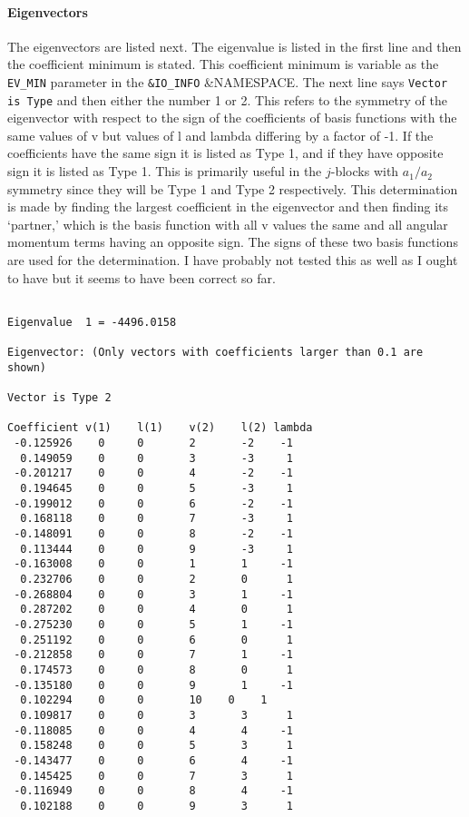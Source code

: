 \documentclass{article}
\begin{document}
\paragraph{Eigenvectors}
The eigenvectors are listed next. The eigenvalue is listed in the first line and then the coefficient minimum is stated. This coefficient minimum is variable as the {\tt EV\_MIN} parameter in the {\tt \&IO\_INFO} \&NAMESPACE. The next line says {\tt Vector is Type} and then either the number 1 or 2. This refers to the symmetry of the eigenvector with respect to the sign of the coefficients of basis functions with the same values of v but values of l and lambda differing by a factor of -1. If the coefficients have the same sign it is listed as Type 1, and if they have opposite sign it is listed as Type 1. This is primarily useful in the $j$-blocks with $a_1/a_2$ symmetry since they will be Type 1 and Type 2 respectively. This determination is made by finding the largest coefficient in the eigenvector and then finding its `partner,' which is the basis function with all v values the same and all angular momentum terms having an opposite sign. The signs of these two basis functions are used for the determination. I have probably not tested this as well as I ought to have but it seems to have been correct so far.

\begin{verbatim}
 
Eigenvalue	1 = -4496.0158 

Eigenvector: (Only vectors with coefficients larger than 0.1 are shown)
 
Vector is Type 2
 
Coefficient	v(1)	l(1)	v(2)	l(2) lambda	
 -0.125926	  0	  	0	  	2	 	-2	  -1	
  0.149059	  0	  	0	  	3	 	-3	   1	
 -0.201217	  0	  	0	  	4	 	-2	  -1	
  0.194645	  0	  	0	  	5	 	-3	   1	
 -0.199012	  0	  	0	  	6	 	-2	  -1	
  0.168118	  0	  	0	  	7	 	-3	   1	
 -0.148091	  0	  	0	  	8	 	-2	  -1	
  0.113444	  0	  	0	  	9	 	-3	   1	
 -0.163008	  0	  	0	  	1	  	1	  -1	
  0.232706	  0	  	0	  	2	  	0	   1	
 -0.268804	  0	  	0	  	3	  	1	  -1	
  0.287202	  0	  	0	  	4	  	0	   1	
 -0.275230	  0	  	0	  	5	  	1	  -1	
  0.251192	  0	  	0	  	6	  	0	   1	
 -0.212858	  0	  	0	  	7	  	1	  -1	
  0.174573	  0	  	0	  	8	  	0	   1	
 -0.135180	  0	  	0	  	9	  	1	  -1	
  0.102294	  0	  	0	  	10	  0	   1	
  0.109817	  0	  	0	  	3	  	3	   1	
 -0.118085	  0	  	0	  	4	  	4	  -1	
  0.158248	  0	  	0	  	5	  	3	   1	
 -0.143477	  0	  	0	  	6	  	4	  -1	
  0.145425	  0	  	0	  	7	  	3	   1	
 -0.116949	  0	  	0	  	8	  	4	  -1	
  0.102188	  0	  	0	  	9	  	3	   1

\end{verbatim}
\end{document}
